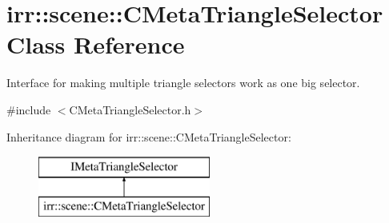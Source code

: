 \hypertarget{classirr_1_1scene_1_1_c_meta_triangle_selector}{\section{irr\-:\-:scene\-:\-:C\-Meta\-Triangle\-Selector Class Reference}
\label{classirr_1_1scene_1_1_c_meta_triangle_selector}
}


Interface for making multiple triangle selectors work as one big selector.  




{\ttfamily \#include $<$C\-Meta\-Triangle\-Selector.\-h$>$}

Inheritance diagram for irr\-:\-:scene\-:\-:C\-Meta\-Triangle\-Selector\-:\begin{figure}[H]
\begin{center}
\leavevmode
\includegraphics[height=2.000000cm]{classirr_1_1scene_1_1_c_meta_triangle_selector}
\end{center}
\end{figure}
